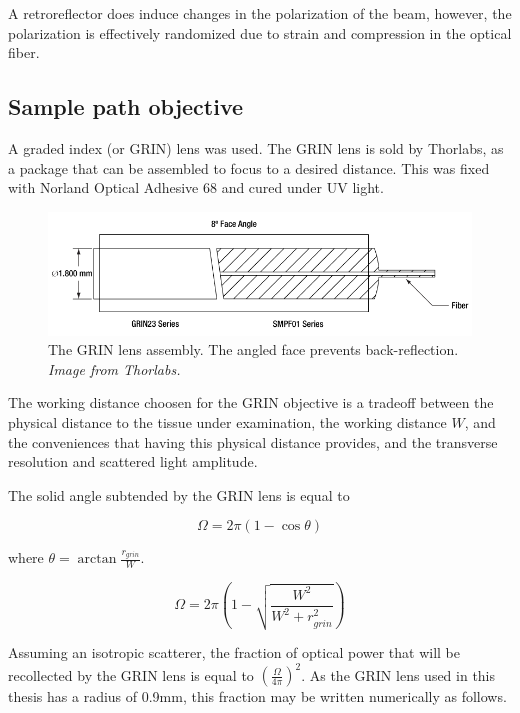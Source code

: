 A retroreflector does induce changes in the polarization of the beam, however, the polarization is effectively randomized due to strain and compression in the optical fiber.

\subsection{Sample path objective}

A graded index (or GRIN) lens was used. The GRIN lens is sold by Thorlabs, as a package that can be assembled to focus to a desired distance. This was fixed with Norland Optical Adhesive 68 and cured under UV light.

\begin{figure}[h!]
\centering
\includegraphics[width=1.0\textwidth]{Images/System/grin.png}
\caption{The GRIN lens assembly. The angled face prevents back-reflection. \em{Image from Thorlabs.}}
\end{figure}

The working distance choosen for the GRIN objective is a tradeoff between the physical distance to the tissue under examination, the working distance $W$, and the conveniences that having this physical distance provides, and the transverse resolution and scattered light amplitude.


The solid angle subtended by the GRIN lens is equal to

\begin{equation}
\Omega = 2 \pi (1 - \cos{\theta})
\end{equation}

where $\theta = \arctan{\frac{r_{grin}}{W}}$.

\begin{equation}
\Omega = 2 \pi \left(1 - \sqrt{\frac{W^2}{W^2 + r_{grin}^2}} \right)
\end{equation}

Assuming an isotropic scatterer, the fraction of optical power that will be recollected by the GRIN lens is equal to $ \left( \frac{\Omega}{4 \pi} \right)^2 $. As the GRIN lens used in this thesis has a radius of 0.9mm, this fraction may be written numerically as follows.

